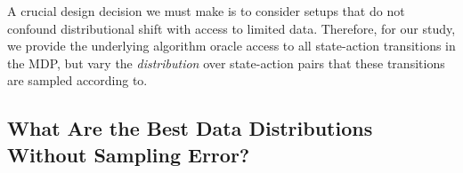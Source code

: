 A crucial design decision we must make is to consider setups that do not confound distributional shift with access to limited data. Therefore, for our study, we provide the underlying algorithm oracle access to all state-action transitions in the MDP, but vary the \emph{distribution} over state-action pairs that these transitions are sampled according to.   

\subsection{What Are the Best Data Distributions Without Sampling Error?}
\label{subsec:dist_shift_exact}


